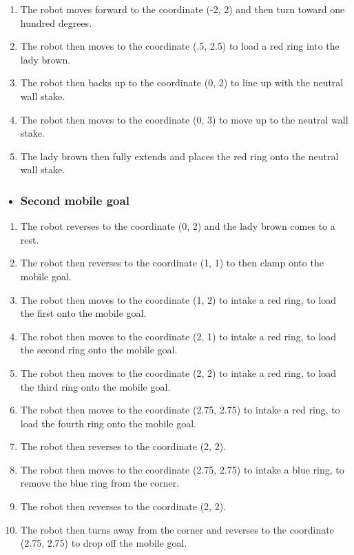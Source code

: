 \begin{enumerate}
    \item The robot moves forward to the coordinate (-2, 2) and then turn toward one hundred degrees.
    \item The robot then moves to the coordinate (.5, 2.5) to load a red ring into the lady brown.
    \item The robot then backs up to the coordinate (0, 2) to line up with the neutral wall stake.
    \item The robot then moves to the coordinate (0, 3) to move up to the neutral wall stake.
    \item The lady brown then fully extends and places the red ring onto the neutral wall stake.
\end{enumerate}
\begin{itemize}
    \item \subsubsection{Second mobile goal}
\end{itemize}
\begin{enumerate}
    \item The robot reverses to the coordinate (0, 2) and the lady brown comes to a rest.
    \item The robot then reverses to the coordinate (1, 1) to then clamp onto the mobile goal. 
    \item The robot then moves to the coordinate (1, 2) to intake a red ring, to load the first onto the mobile goal.
    \item The robot then moves to the coordinate (2, 1) to intake a red ring, to load the second ring onto the mobile goal.
    \item The robot then moves to the coordinate (2, 2) to intake a red ring, to load the third ring onto the mobile goal.
    \item The robot then moves to the coordinate (2.75, 2.75) to intake a red ring, to load the fourth ring onto the mobile goal.
    \item The robot then reverses to the coordinate (2, 2).
    \item The robot then moves to the coordinate (2.75, 2.75) to intake a blue ring, to remove the blue ring from the corner.
    \item The robot then reverses to the coordinate (2, 2).
    \item The robot then turns away from the corner and reverses to the coordinate (2.75, 2.75) to drop off the mobile goal.
\end{enumerate}
